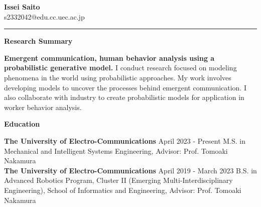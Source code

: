 \documentclass[a4paper,10pt]{article}
\begin{document}
\begin{center}
    \textbf{\LARGE Issei Saito} \\
    s2332042@edu.cc.uec.ac.jp 
\end{center}

\noindent\rule{\textwidth}{1.5pt}

\noindent
\begin{minipage}[t]{0.3\textwidth}
    \textbf{Research Summary}
\end{minipage}%
\begin{minipage}[t]{0.7\textwidth}
    \textbf{Emergent communication, human behavior analysis using a probabilistic generative model.} \newline
    I conduct research focused on modeling phenomena in the world using probabilistic approaches. My work involves developing models to uncover the processes behind emergent communication. I also collaborate with industry to create probabilistic models for application in worker behavior analysis. \newline
\end{minipage}

\vspace{10pt}

\noindent
\begin{minipage}[t]{0.3\textwidth}
    \textbf{Education}
\end{minipage}%
\begin{minipage}[t]{0.7\textwidth}
    \textbf{The University of Electro-Communications} \hfill April 2023 - Present \newline
    M.S. in Mechanical and Intelligent Systems Engineering, \newline
    Advisor: Prof. Tomoaki Nakamura \newline\\
    \textbf{The University of Electro-Communications} \hfill April 2019 - March 2023 \newline
    B.S. in Advanced Robotics Program, Cluster II (Emerging Multi-Interdisciplinary Engineering), School of Informatics and Engineering, \newline
    Advisor: Prof. Tomoaki Nakamura \newline
\end{minipage}

\vspace{10pt}
\end{document}
